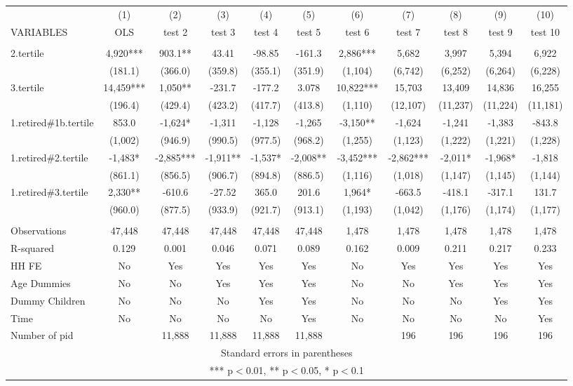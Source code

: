\begin{tabular}{lcccccccccc} \hline
 & (1) & (2) & (3) & (4) & (5) & (6) & (7) & (8) & (9) & (10) \\
VARIABLES & OLS & test 2 & test 3 & test 4 & test 5 & test 6 & test 7 & test 8 & test 9 & test 10 \\ \hline
 &  &  &  &  &  &  &  &  &  &  \\
2.tertile & 4,920*** & 903.1** & 43.41 & -98.85 & -161.3 & 2,886*** & 5,682 & 3,997 & 5,394 & 6,922 \\
 & (181.1) & (366.0) & (359.8) & (355.1) & (351.9) & (1,104) & (6,742) & (6,252) & (6,264) & (6,228) \\
3.tertile & 14,459*** & 1,050** & -231.7 & -177.2 & 3.078 & 10,822*** & 15,703 & 13,409 & 14,836 & 16,255 \\
 & (196.4) & (429.4) & (423.2) & (417.7) & (413.8) & (1,110) & (12,107) & (11,237) & (11,224) & (11,181) \\
1.retired\#1b.tertile & 853.0 & -1,624* & -1,311 & -1,128 & -1,265 & -3,150** & -1,624 & -1,241 & -1,383 & -843.8 \\
 & (1,002) & (946.9) & (990.5) & (977.5) & (968.2) & (1,255) & (1,123) & (1,222) & (1,221) & (1,228) \\
1.retired\#2.tertile & -1,483* & -2,885*** & -1,911** & -1,537* & -2,008** & -3,452*** & -2,862*** & -2,011* & -1,968* & -1,818 \\
 & (861.1) & (856.5) & (906.7) & (894.8) & (886.5) & (1,116) & (1,018) & (1,147) & (1,145) & (1,144) \\
1.retired\#3.tertile & 2,330** & -610.6 & -27.52 & 365.0 & 201.6 & 1,964* & -663.5 & -418.1 & -317.1 & 131.7 \\
 & (960.0) & (877.5) & (933.9) & (921.7) & (913.1) & (1,193) & (1,042) & (1,176) & (1,174) & (1,177) \\
 &  &  &  &  &  &  &  &  &  &  \\
Observations & 47,448 & 47,448 & 47,448 & 47,448 & 47,448 & 1,478 & 1,478 & 1,478 & 1,478 & 1,478 \\
R-squared & 0.129 & 0.001 & 0.046 & 0.071 & 0.089 & 0.162 & 0.009 & 0.211 & 0.217 & 0.233 \\
HH FE & No & Yes & Yes & Yes & Yes & No & Yes & Yes & Yes & Yes \\
Age Dummies & No & No & Yes & Yes & Yes & No & No & Yes & Yes & Yes \\
Dummy Children & No & No & No & Yes & Yes & No & No & No & Yes & Yes \\
Time & No & No & No & No & Yes & No & No & No & No & Yes \\
 Number of pid &  & 11,888 & 11,888 & 11,888 & 11,888 &  & 196 & 196 & 196 & 196 \\ \hline
\multicolumn{11}{c}{ Standard errors in parentheses} \\
\multicolumn{11}{c}{ *** p$<$0.01, ** p$<$0.05, * p$<$0.1} \\
\end{tabular}
